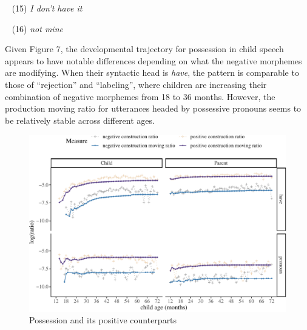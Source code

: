 \documentclass[
  english,
  man,floatsintext]{apa6}
\begin{document}
~
(15) \emph{I don't have it}

~
(16) \emph{not mine}

Given Figure 7, the developmental trajectory for possession in child speech appears to have notable differences depending on what the negative morphemes are modifying. When their syntactic head is \emph{have}, the pattern is comparable to those of \enquote{rejection} and \enquote{labeling}, where children are increasing their combination of negative morphemes from 18 to 36 months. However, the production moving ratio for utterances headed by possessive pronouns seems to be relatively stable across different ages.

\begin{figure}[H]

{\centering \includegraphics{neg_construction_article_files/figure-latex/possession-1} 

}

\caption{Possession and its positive counterparts}\label{fig:possession}
\end{figure}
\end{document}
